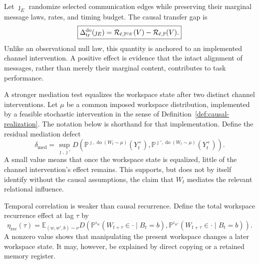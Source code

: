 Let \(\jmath_E\) randomize selected communication edges while preserving their
marginal message laws, rates, and timing budget. The causal transfer gap is
\[
\boxed{
\Delta_{\mathrm{tr}}^{\operatorname{do}}(\jmath_E)
=
\mathcal R_{\ell,\mathbb P^{\jmath_E}}(V)
-
\mathcal R_{\ell,\mathbb P}(V).
}
\]
Unlike an observational null law, this quantity is anchored to an implemented
channel intervention. A positive effect is evidence that the intact alignment
of messages, rather than merely their marginal content, contributes to task
performance.

A stronger mediation test equalizes the workspace state after two distinct
channel interventions. Let \(\mu\) be a common imposed workspace distribution,
implemented by a feasible stochastic intervention in the sense of
Definition~\ref{def:causal-realization}. The notation below is shorthand for
that implementation. Define the residual mediation defect
\[
\delta_{\mathrm{med}}
=
\sup_{\jmath,\jmath'}
D\!\left(
\mathbb P^{\jmath,\operatorname{do}(W_t\sim\mu)}(Y_t^+),
\mathbb P^{\jmath',\operatorname{do}(W_t\sim\mu)}(Y_t^+)
\right).
\]
A small value means that once the workspace state is equalized, little of the
channel intervention's effect remains. This supports, but does not by itself
identify without the causal assumptions, the claim that \(W_t\) mediates the
relevant relational influence.


Temporal correlation is weaker than causal recurrence. Define the total
workspace recurrence effect at lag \(\tau\) by
\[
\boxed{
\eta_{\mathrm{rec}}(\tau)
=
\mathbb E_{(w,w',b)\sim\nu}
D\!\left(
\mathbb P^{\iota_w}(W_{t+\tau}\in\cdot\mid B_t=b),
\mathbb P^{\iota_{w'}}(W_{t+\tau}\in\cdot\mid B_t=b)
\right).
}
\]
A nonzero value shows that manipulating the present workspace changes a later
workspace state. It may, however, be explained by direct copying or a retained
memory register.

